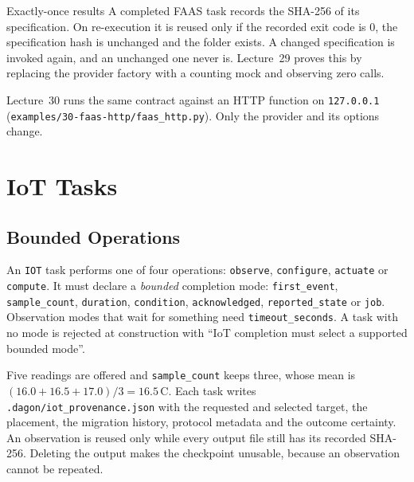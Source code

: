 \begin{definitionbox}{Exactly-once results}
A completed FAAS task records the SHA-256 of its specification. On re-execution it is reused only if the recorded exit code is 0, the
specification hash is unchanged and the folder exists. A changed specification is invoked again, and an unchanged one never is.
Lecture~29 proves this by replacing the provider factory with a counting mock
and observing zero calls.
\end{definitionbox}

Lecture~30 runs the same contract against an HTTP function on
\texttt{127.0.0.1} (\texttt{examples/30-faas-http/faas\_http.py}). Only the
provider and its options change.

\section{IoT Tasks}

\subsection{Bounded Operations}

An \texttt{IOT} task performs one of four operations: \texttt{observe},
\texttt{configure}, \texttt{actuate} or \texttt{compute}. It must declare a
\emph{bounded} completion mode: \texttt{first\_event},
\texttt{sample\_count}, \texttt{duration}, \texttt{condition},
\texttt{acknowledged}, \texttt{reported\_state} or \texttt{job}. Observation
modes that wait for something need \texttt{timeout\_seconds}. A task with no
mode is rejected at construction with ``IoT completion must select a
supported bounded mode''.





Five readings are offered and \texttt{sample\_count} keeps three, whose
mean is $(16.0 + 16.5 + 17.0)/3 = 16.5$\,\textdegree C. Each task writes
\texttt{.dagon/iot\_provenance.json} with the requested and selected target,
the placement, the migration history, protocol metadata and the outcome
certainty. An observation is reused only while every output file still has
its recorded SHA-256. Deleting the output makes the checkpoint unusable,
because an observation cannot be repeated.

